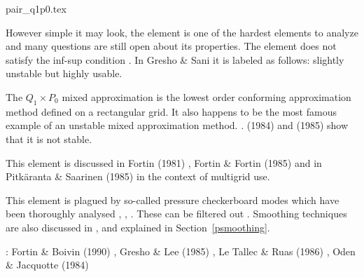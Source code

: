\begin{flushright} {\tiny {\color{gray} pair\_q1p0.tex}} \end{flushright}


\begin{minipage}{0.48\textwidth}
\begin{center}

\end{center}
\end{minipage}
\begin{minipage}{0.48\textwidth}
\begin{center}

\end{center}
\end{minipage}

However simple it may look, the  element is 
one of the hardest elements to analyze and many questions are still open about its properties. 
The element does not satisfy the inf-sup condition \cite[p211]{hugh}. 
In Gresho \& Sani \cite{grsa} it is labeled as follows: slightly unstable but highly usable. 

The $Q_1 \times P_0$ mixed approximation is the lowest order conforming approximation 
method defined on a rectangular grid. It also happens to be the most famous example 
of an unstable mixed approximation method.
\cite[p235]{elsw}.
\textcite{boni84} (1984) and \textcite{boni85} (1985) show that it is not stable.

This element is discussed in Fortin (1981) \cite{fort81}, Fortin \& Fortin (1985) \cite{fofo85} 
and in Pitk\"aranta \& Saarinen (1985) \cite{pisa85} in the context of multigrid use.

This element is plagued by so-called pressure checkerboard modes which
have been thoroughly analysed \cite{grsi94}, \cite{chpc95}, \cite{sagl81a,sagl81b}.
These can be filtered out \cite{chpc95}. Smoothing techniques are also discussed in \cite{legs79}, 
and explained in Section~\ref{psmoothing}.

\Literature: Fortin \& Boivin (1990) \cite{fobo90}, Gresho \& Lee (1985) \cite{grle85},
Le Tallec \& Ruas (1986) \cite{leru86}, Oden \& Jacquotte (1984) \cite{odja84}
